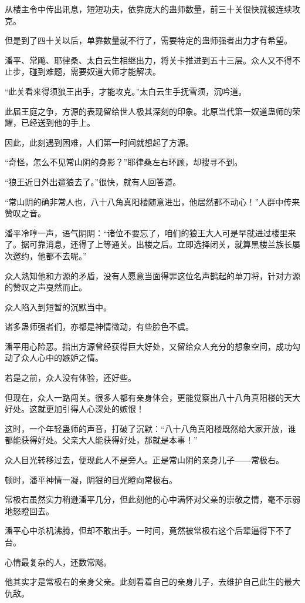 \begin{this_body}
从楼主令中传出讯息，短短功夫，依靠庞大的蛊师数量，前三十关很快就被连续攻克。

但是到了四十关以后，单靠数量就不行了，需要特定的蛊师强者出力才有希望。

潘平、常飚、耶律桑、太白云生相继出力，将关卡推进到五十三层。众人又不得不止步，碰到难题，需要奴道大师才能解决。

“此关看来得须狼王出手，才能攻克。”太白云生手抚雪须，沉吟道。

此届王庭之争，方源的表现留给世人极其深刻的印象。北原当代第一奴道蛊师的荣耀，已经送到他的手上。

因此，此刻遇到困难，人们第一时间就想起了方源。

“奇怪，怎么不见常山阴的身影？”耶律桑左右环顾，却搜寻不到。

“狼王近日外出遛狼去了。”很快，就有人回答道。

“常山阴的确非常人也，八十八角真阳楼随意进出，他居然都不动心！”人群中传来赞叹之音。

潘平冷哼一声，语气阴阴：“诸位不要忘了，咱们的狼王大人可是早就进过楼里来了。据可靠消息，还得了上等通关。出楼之后。立即选择闭关，就算黑楼兰族长屡次邀约，他都不去呢。”

众人熟知他和方源的矛盾，没有人愿意当面得罪这位名声鹊起的单刀将，针对方源的赞叹之声戛然而止。

众人陷入到短暂的沉默当中。

诸多蛊师强者们，亦都是神情微动，有些脸色不虞。

潘平用心险恶。指出方源曾经获得巨大好处，又留给众人充分的想象空间，成功勾动了众人心中的嫉妒之情。

若是之前，众人没有体验，还好些。

但现在，众人一路闯关。很多人都有亲身体会，更能觉察出八十八角真阳楼的天大好处。这就更加引得人心深处的嫉恨！

这时，一个年轻蛊师的声音，打破了沉默：“八十八角真阳楼既然给大家开放，谁都能获得好处。父亲大人能获得好处，那就是本事！”

众人目光转移过去，便现此人不是旁人。正是常山阴的亲身儿子――常极右。

顿时，潘平神情一凝，阴狠的目光瞪向常极右。

常极右虽然实力稍逊潘平几分，但此刻他的心中满怀对父亲的崇敬之情，毫不示弱地怒瞪回去。

潘平心中杀机沸腾，但却不敢出手。一时间，竟然被常极右这个后辈逼得下不了台。

心情最复杂的人，还数常飚。

他其实才是常极右的亲身父亲。此刻看着自己的亲身儿子，去维护自己此生的最大仇敌。


\end{this_body}
